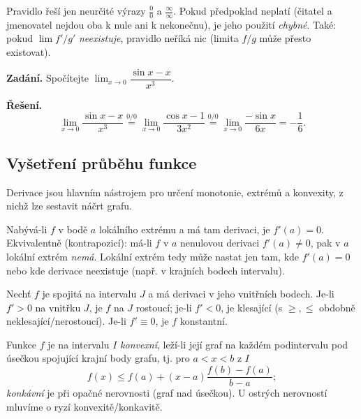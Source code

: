 \documentclass[11pt,a4paper]{article}
\begin{document}
\begin{poznamka}
Pravidlo řeší jen neurčité výrazy $\tfrac00$ a $\tfrac{\infty}{\infty}$. Pokud předpoklad neplatí (čitatel a jmenovatel nejdou oba k nule ani k nekonečnu), je jeho použití \emph{chybné}. Také: pokud $\lim f'/g'$ \emph{neexistuje}, pravidlo neříká nic (limita $f/g$ může přesto existovat).
\end{poznamka}

\begin{priklad}
\textbf{Zadání.} Spočítejte $\lim_{x\to0}\dfrac{\sin x-x}{x^3}$.\par
\textbf{Řešení.}
\[
  \lim_{x\to0}\frac{\sin x-x}{x^3}
  \overset{0/0}{=}\lim_{x\to0}\frac{\cos x-1}{3x^2}
  \overset{0/0}{=}\lim_{x\to0}\frac{-\sin x}{6x}=-\frac16.
\]
\end{priklad}

\subsection{Vyšetření průběhu funkce}

Derivace jsou hlavním nástrojem pro určení monotonie, extrémů a konvexity, z nichž lze sestavit náčrt grafu.

\begin{veta}
Nabývá-li $f$ v bodě $a$ lokálního extrému a má tam derivaci, je $f'(a)=0$. Ekvivalentně (kontrapozicí): má-li $f$ v $a$ nenulovou derivaci $f'(a)\neq0$, pak v $a$ lokální extrém \emph{nemá}. Lokální extrém tedy může nastat jen tam, kde $f'(a)=0$ nebo kde derivace neexistuje (např. v krajních bodech intervalu).
\end{veta}

\begin{veta}
Nechť $f$ je spojitá na intervalu $J$ a má derivaci v jeho vnitřních bodech. Je-li $f'>0$ na vnitřku $J$, je $f$ na $J$ rostoucí; je-li $f'<0$, je klesající (s $\ge,\le$ obdobně neklesající/nerostoucí). Je-li $f'\equiv0$, je $f$ konstantní.
\end{veta}

\begin{definice}
Funkce $f$ je na intervalu $I$ \emph{konvexní}, leží-li její graf na každém podintervalu pod úsečkou spojující krajní body grafu, tj. pro $a<x<b$ z $I$
\[
  f(x)\le f(a)+(x-a)\frac{f(b)-f(a)}{b-a};
\]
\emph{konkávní} je při opačné nerovnosti (graf nad úsečkou). U ostrých nerovností mluvíme o ryzí konvexitě/konkavitě.
\end{definice}
\end{document}
